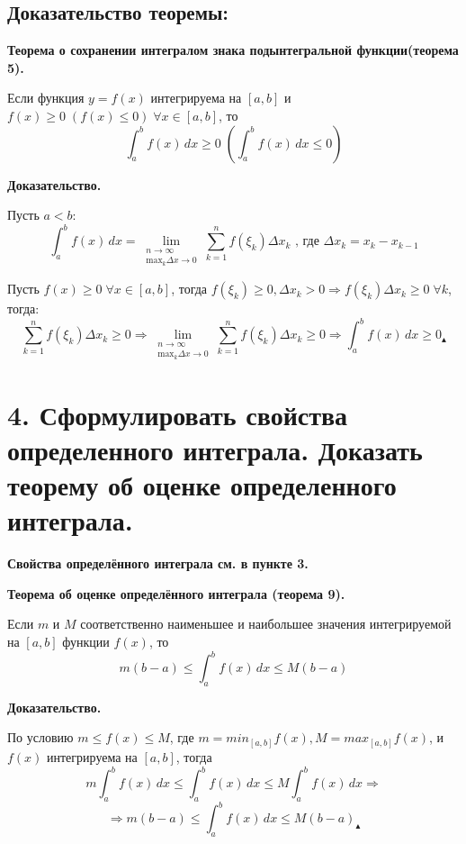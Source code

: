\documentclass[11pt]{article}
\begin{document}
\subsection*{Доказательство теоремы:}
\par\textbf{Теорема о сохранении интегралом знака подынтегральной функции(теорема 5).}
\par Если функция $y = f(x)$ интегрируема на $[a, b]$ и $f(x) \geq 0 \; (f(x) \leq 0) \; \forall x \in [a, b]$, то $$\int_{a}^b f(x) \, dx \geq 0 \; \left( \int_{a}^b f(x) \, dx \leq 0 \right)$$
\par\textbf{Доказательство.}
\par Пусть $a < b$: $$\int_{a}^b f(x) \, dx = \lim_{ \substack{n \to \infty \\ \text{max}_{k}\Delta x \to 0}} \sum_{k = 1}^n f(\xi_{k}) \Delta x_{k}\text{ , где } \Delta x_{k} = x_{k} - x_{k - 1}$$
\par Пусть $f(x) \geq 0 \; \forall x \in [a, b]$, тогда $f(\xi_{k}) \geq 0, \Delta x_{k} > 0 \Rightarrow f(\xi_{k}) \Delta x_{k} \geq 0 \; \forall k$, тогда: $$\sum_{k=1}^n f(\xi_{k}) \Delta x_{k} \geq 0 \Rightarrow \lim_{ \substack{n \to \infty \\ \text{max}_{k}\Delta x \to 0}} \sum_{k = 1}^n f(\xi_{k}) \Delta x_{k} \geq 0 \Rightarrow \int_{a}^b f(x) \, dx \geq 0 _\blacktriangle$$

\section*{4. Сформулировать свойства определенного интеграла. Доказать теорему об оценке определенного интеграла.}
\par\textbf{Свойства определённого интеграла см. в пункте 3.}
\par\textbf{Теорема об оценке определённого интеграла (теорема 9).}
\par Если $m$ и $M$ соответственно наименьшее и наибольшее значения интегрируемой на $[a, b]$ функции $f(x)$, то $$m(b - a) \leq \int_{a}^b f(x) \, dx \leq M(b - a)$$
\par\textbf{Доказательство.}
\par По условию $m \leq f(x) \leq M$, где $m = min_{[a, b]} f(x), M = max_{[a, b]} f(x)$, и $f(x)$ интегрируема на $[a, b]$, тогда $$m \int_a^b  f(x) \, dx \leq \int_{a}^b f(x)\, dx  \leq M \int_{a}^b f(x)\, dx \Rightarrow$$$$\Rightarrow m(b - a) \leq \int_{a}^b f(x)\, dx \leq M(b - a) _\blacktriangle$$
\end{document}
